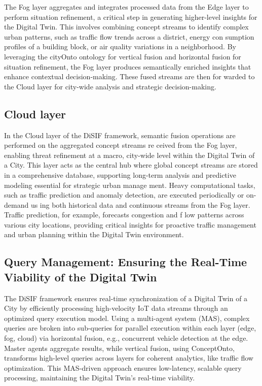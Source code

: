 \documentclass[5p,times]{elsarticle}
\begin{document}
The Fog layer aggregates and integrates processed data from
the Edge layer to perform situation refinement, a critical step
in generating higher-level insights for the Digital Twin. This
involves combining concept streams to identify complex urban
patterns, such as traffic flow trends across a district, energy con
sumption profiles of a building block, or air quality variations
in a neighborhood. By leveraging the cityOnto ontology for
vertical fusion and horizontal fusion for situation refinement, the
Fog layer produces semantically enriched insights that enhance
contextual decision-making. These fused streams are then for
warded to the Cloud layer for city-wide analysis and strategic
decision-making.











\subsection{Cloud layer}

In the Cloud layer of the DiSIF framework, semantic fusion
operations are performed on the aggregated concept streams re
ceived from the Fog layer, enabling threat refinement at a macro,
city-wide level within the Digital Twin of a City. This layer
acts as the central hub where global concept streams are stored
in a comprehensive database, supporting long-term analysis
and predictive modeling essential for strategic urban manage
ment. Heavy computational tasks, such as traffic prediction and
anomaly detection, are executed periodically or on-demand us
ing both historical data and continuous streams from the Fog
layer. Traffic prediction, for example, forecasts congestion and
f
low patterns across various city locations, providing critical
insights for proactive traffic management and urban planning
within the Digital Twin environment.


\subsection{Query Management: Ensuring the Real-Time Viability of the Digital Twin}

The DiSIF framework ensures real-time synchronization of a Digital Twin of a 
City by efficiently processing high-velocity IoT data streams through an
 optimized query execution model. Using a multi-agent system (MAS), complex 
 queries are broken into sub-queries for parallel execution within each layer
  (edge, fog, cloud) via horizontal fusion, e.g., concurrent vehicle detection
   at the edge. Master agents aggregate results, while vertical fusion, using ConceptOnto,
    transforms high-level queries across layers for coherent analytics, like traffic
     flow optimization. This MAS-driven approach ensures low-latency, scalable query
      processing, maintaining the Digital Twin's real-time viability.
\end{document}
